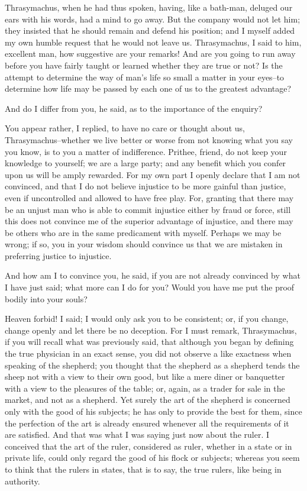 Thrasymachus, when he had thus spoken, having, like a bath-man, deluged
our ears with his words, had a mind to go away. But the company
would not let him; they insisted that he should remain and defend his
position; and I myself added my own humble request that he would not
leave us. Thrasymachus, I said to him, excellent man, how suggestive
are your remarks! And are you going to run away before you have fairly
taught or learned whether they are true or not? Is the attempt to
determine the way of man's life so small a matter in your eyes--to
determine how life may be passed by each one of us to the greatest
advantage?

And do I differ from you, he said, as to the importance of the enquiry?

You appear rather, I replied, to have no care or thought about us,
Thrasymachus--whether we live better or worse from not knowing what you
say you know, is to you a matter of indifference. Prithee, friend,
do not keep your knowledge to yourself; we are a large party; and any
benefit which you confer upon us will be amply rewarded. For my own
part I openly declare that I am not convinced, and that I do not believe
injustice to be more gainful than justice, even if uncontrolled and
allowed to have free play. For, granting that there may be an unjust
man who is able to commit injustice either by fraud or force, still this
does not convince me of the superior advantage of injustice, and there
may be others who are in the same predicament with myself. Perhaps we
may be wrong; if so, you in your wisdom should convince us that we are
mistaken in preferring justice to injustice.

And how am I to convince you, he said, if you are not already convinced
by what I have just said; what more can I do for you? Would you have me
put the proof bodily into your souls?

Heaven forbid! I said; I would only ask you to be consistent; or, if you
change, change openly and let there be no deception. For I must remark,
Thrasymachus, if you will recall what was previously said, that although
you began by defining the true physician in an exact sense, you did not
observe a like exactness when speaking of the shepherd; you thought that
the shepherd as a shepherd tends the sheep not with a view to their own
good, but like a mere diner or banquetter with a view to the pleasures
of the table; or, again, as a trader for sale in the market, and not as
a shepherd. Yet surely the art of the shepherd is concerned only with
the good of his subjects; he has only to provide the best for them,
since the perfection of the art is already ensured whenever all the
requirements of it are satisfied. And that was what I was saying just
now about the ruler. I conceived that the art of the ruler, considered
as ruler, whether in a state or in private life, could only regard the
good of his flock or subjects; whereas you seem to think that the rulers
in states, that is to say, the true rulers, like being in authority.

